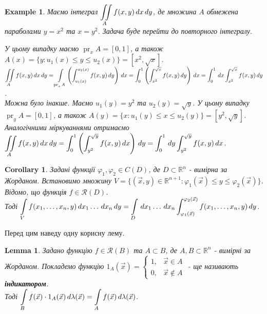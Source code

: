 \documentclass[a4paper, 10pt]{article}
\def\huge{\displaystyle}
\theoremstyle{theoremdd}
\theoremstyle{theoremdd}
\theoremstyle{theoremdd}
\theoremstyle{theoremdd}
\theoremstyle{theoremdd}
\newtheorem{example}[theorem]{Example}
\theoremstyle{theoremdd}
\theoremstyle{theoremdd}
\theoremstyle{theoremdd}
\theoremstyle{theoremdd}
\theoremstyle{theoremdd}
\theoremstyle{theoremdd}
\theoremstyle{theoremdd}
\theoremstyle{theoremdd}
\newtheorem{lemma}[theorem]{Lemma}
\theoremstyle{theoremdd}
\newtheorem{corollary}[theorem]{Corollary}
\theoremstyle{theoremdd}
\DeclareMathOperator{\pr}{pr}
\begin{document}
\begin{example}
Маємо інтеграл $\displaystyle\iint\displaylimits_A f(x,y)\,dx\,dy$, де множина $A$ обмежена параболами $y = x^2$ та $x = y^2$. Задача буде перейти до повторного інтегралу.
\begin{figure}[H]
\centering
{}
\end{figure}
У цьому випадку маємо $\pr_x A = [0,1]$, а також $A(x) = \{ y: u_1(x) \leq y \leq u_2(x) \} = [x^2, \sqrt{x}]$.\\
$\displaystyle\iint\displaylimits_A f(x,y)\,dx\,dy = \int\displaylimits_{\pr_x A} \left( \int_{u_1(x)}^{u_2(x)} f(x,y)\,dy \right)\,dx = \int_0^1 \left( \int_{x^2}^{\sqrt{x}} f(x,y)\,dy\right)\,dx = \int_0^1\,dx \int_{x^2}^{\sqrt{x}} f(x,y)\,dy$.
\bigskip \\
Можна було інакше. Маємо $u_1(y) = y^2$ та $u_2(y) = \sqrt{y}$. У цьому випадку $\pr_y A = [0,1]$, а також $A(y) = \{x : u_1(y) \leq x \leq u_2(y)\} = [y^2, \sqrt{y}]$. Аналогічними міркуваннями отримаємо\\
$\displaystyle\iint\displaylimits_A f(x,y)\,dx\,dy = \int_0^1 \left( \int_{y^2}^{\sqrt{y}} f(x,y)\,dx \right)\,dy = \int_0^1\,dy \int_{y^2}^{\sqrt{y}} f(x,y)\,dx$.
\end{example}

\iffalse
\begin{corollary}
Задані функції $\varphi_1,\varphi_2 \in C(D)$, де $D \subset \mathbb{R}^n$ - вимірна за Жорданом. Встановимо множину $V = \{(\vec{x},y) \in \mathbb{R}^{n+1}: \varphi_1(\vec{x}) \leq y \leq \varphi_2(\vec{x})\}$. Відомо, що функція $f \in \mathcal{R}(D)$.\\
Тоді $\huge\int\displaylimits_V f(x_1,\dots,x_n,y)\,dx_1\dots \,dx_n\,dy = \int\displaylimits_D \,dx_1 \dots \,dx_n \int_{\varphi_1(\vec{x})}^{\varphi_2(\vec{x})} f(x_1,\dots,x_n,y)\,dy$.
\end{corollary}

Перед цим наведу одну корисну лему.\\
\begin{lemma}
Задано функцію $f \in \mathcal{R}(B)$ та $A \subset B$, де $A,B \subset \mathbb{R}^n$ - вимірні за Жорданом. Покладемо функцію $1_A(\vec{x}) = \begin{cases} 1, & \vec{x} \in A \\ 0, & \vec{x} \not\in A \end{cases}$ - ще називають \textbf{індикатором}.\\
Тоді $\huge\int\displaylimits_B f(\vec{x}) \cdot 1_{A}(\vec{x})\,d \lambda(\vec{x}) = \int\displaylimits_A f(\vec{x})\,d\lambda(\vec{x})$.
\end{lemma}
\end{document}
